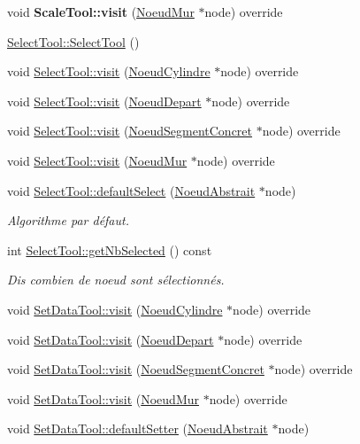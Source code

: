 \begin{DoxyCompactItemize}
\item 
\hypertarget{group__inf2990_ga376afcceadc7462902ff0e3bad3573e9}{}void {\bfseries Scale\+Tool\+::visit} (\hyperlink{class_noeud_mur}{Noeud\+Mur} $\ast$node) override\label{group__inf2990_ga376afcceadc7462902ff0e3bad3573e9}

\item 
\hyperlink{group__inf2990_ga2174af55e744036f0ccc5ce1fe25ddb1}{Select\+Tool\+::\+Select\+Tool} ()
\item 
void \hyperlink{group__inf2990_gacd9fee116b738725ab0f664029253fa0}{Select\+Tool\+::visit} (\hyperlink{class_noeud_cylindre}{Noeud\+Cylindre} $\ast$node) override
\item 
void \hyperlink{group__inf2990_ga392f7eb2a74106cff675878f5453a9d3}{Select\+Tool\+::visit} (\hyperlink{class_noeud_depart}{Noeud\+Depart} $\ast$node) override
\item 
void \hyperlink{group__inf2990_ga3e4db43bef245d0d88d49f018fee424f}{Select\+Tool\+::visit} (\hyperlink{class_noeud_segment_concret}{Noeud\+Segment\+Concret} $\ast$node) override
\item 
void \hyperlink{group__inf2990_gab6a7d46d8fad7c1045678b6dec3c9400}{Select\+Tool\+::visit} (\hyperlink{class_noeud_mur}{Noeud\+Mur} $\ast$node) override
\item 
void \hyperlink{group__inf2990_ga01b8ec1322baa74ee48e5087337bc959}{Select\+Tool\+::default\+Select} (\hyperlink{class_noeud_abstrait}{Noeud\+Abstrait} $\ast$node)
\begin{DoxyCompactList}\small\item\em Algorithme par défaut. \end{DoxyCompactList}\item 
int \hyperlink{group__inf2990_gaca4f60cc972b5d9df612f48c18c8364a}{Select\+Tool\+::get\+Nb\+Selected} () const 
\begin{DoxyCompactList}\small\item\em Dis combien de noeud sont sélectionnés. \end{DoxyCompactList}\item 
void \hyperlink{group__inf2990_gaab929a1ed9e3f6a2e80a15aef5de8f71}{Set\+Data\+Tool\+::visit} (\hyperlink{class_noeud_cylindre}{Noeud\+Cylindre} $\ast$node) override
\item 
void \hyperlink{group__inf2990_gabe996cec1a80bdb4a10383bf4716532d}{Set\+Data\+Tool\+::visit} (\hyperlink{class_noeud_depart}{Noeud\+Depart} $\ast$node) override
\item 
void \hyperlink{group__inf2990_ga5c1484b543077d2a267347edff94266c}{Set\+Data\+Tool\+::visit} (\hyperlink{class_noeud_segment_concret}{Noeud\+Segment\+Concret} $\ast$node) override
\item 
void \hyperlink{group__inf2990_ga5833b6797fd9a603bedd502431fc76cc}{Set\+Data\+Tool\+::visit} (\hyperlink{class_noeud_mur}{Noeud\+Mur} $\ast$node) override
\item 
\hypertarget{group__inf2990_ga410f169c9f53a3a018bce606e0ba9f23}{}void \hyperlink{group__inf2990_ga410f169c9f53a3a018bce606e0ba9f23}{Set\+Data\+Tool\+::default\+Setter} (\hyperlink{class_noeud_abstrait}{Noeud\+Abstrait} $\ast$node)\label{group__inf2990_ga410f169c9f53a3a018bce606e0ba9f23}


\end{DoxyCompactItemize}
